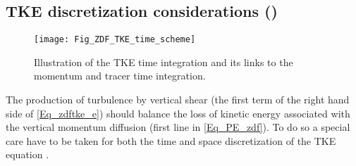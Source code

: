 \documentclass[NEMO_book]{subfiles}
\begin{document}
\subsection{TKE discretization considerations ()}
\label{ZDF_tke_ene}

\begin{figure}[!t]   \begin{center}
\texttt{[image: Fig\_ZDF\_TKE\_time\_scheme]}
\caption{ \label{Fig_TKE_time_scheme} 
Illustration of the TKE time integration and its links to the momentum and tracer time integration. }
\end{center}  
\end{figure}

The production of turbulence by vertical shear (the first term of the right hand side 
of \eqref{Eq_zdftke_e}) should balance the loss of kinetic energy associated with
the vertical momentum diffusion (first line in \eqref{Eq_PE_zdf}). To do so a special care 
have to be taken for both the time and space discretization of the TKE equation 
\citep{Burchard_OM02,Marsaleix_al_OM08}.
\end{document}
